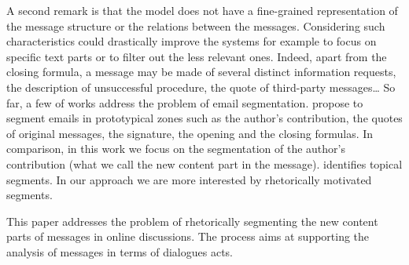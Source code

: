 A second remark is that the model does not have a fine-grained representation of the message structure or the relations between the messages. Considering such characteristics could drastically improve the systems for example to focus on specific text parts or to filter out the less relevant ones. 
Indeed, apart from the closing formula, a message may be made of several distinct information requests, the description of unsuccessful procedure, the quote of third-party messages\ldots
So far, a few of works address the problem of email segmentation.
\cite{lampert:2009:emnlp} propose to segment emails in prototypical zones such as the author's contribution, the quotes of original messages, the signature, the opening and the closing formulas. 
In comparison, in this work we focus on the segmentation of the author's contribution (what we call the new content part in the message).
\cite{joty:2013:jair} identifies topical segments. In our approach we are more interested by rhetorically motivated segments.

This paper addresses the problem of rhetorically segmenting the new content parts of messages in online discussions. The process aims at supporting the analysis of messages in terms of dialogues acts.

